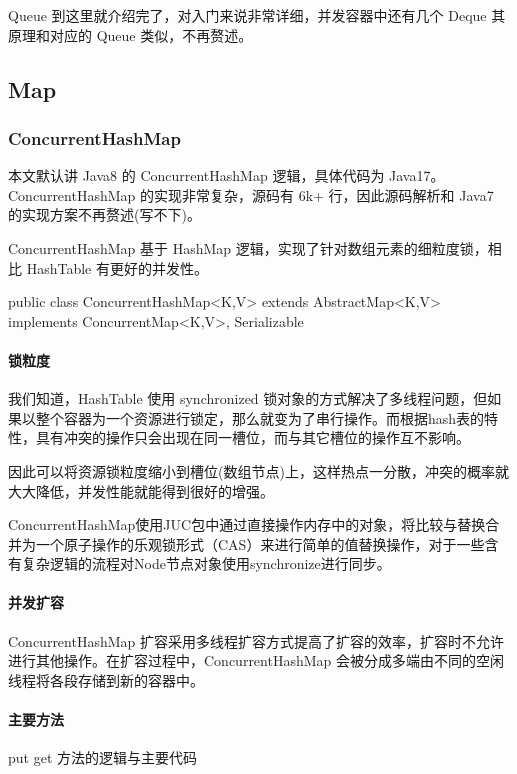 Queue 到这里就介绍完了，对入门来说非常详细，并发容器中还有几个 Deque 其原理和对应的 Queue 类似，不再赘述。 

\subsection{Map}

\subsubsection{ConcurrentHashMap}

本文默认讲 Java8 的 ConcurrentHashMap 逻辑，具体代码为 Java17。ConcurrentHashMap 的实现非常复杂，源码有 6k+ 行，因此源码解析和 Java7 的实现方案不再赘述(写不下)。

ConcurrentHashMap 基于 HashMap 逻辑，实现了针对数组元素的细粒度锁，相比 HashTable 有更好的并发性。

\begin{Java}
public class ConcurrentHashMap<K,V> extends AbstractMap<K,V> implements ConcurrentMap<K,V>, Serializable
\end{Java}

\paragraph*{锁粒度}

我们知道，HashTable 使用 synchronized 锁对象的方式解决了多线程问题，但如果以整个容器为一个资源进行锁定，那么就变为了串行操作。而根据hash表的特性，具有冲突的操作只会出现在同一槽位，而与其它槽位的操作互不影响。

因此可以将资源锁粒度缩小到槽位(数组节点)上，这样热点一分散，冲突的概率就大大降低，并发性能就能得到很好的增强。

ConcurrentHashMap使用JUC包中通过直接操作内存中的对象，将比较与替换合并为一个原子操作的乐观锁形式（CAS）来进行简单的值替换操作，对于一些含有复杂逻辑的流程对Node节点对象使用synchronize进行同步。

\paragraph*{并发扩容}

ConcurrentHashMap 扩容采用多线程扩容方式提高了扩容的效率，扩容时不允许进行其他操作。在扩容过程中，ConcurrentHashMap 会被分成多端由不同的空闲线程将各段存储到新的容器中。

\paragraph*{主要方法} put get 方法的逻辑与主要代码

